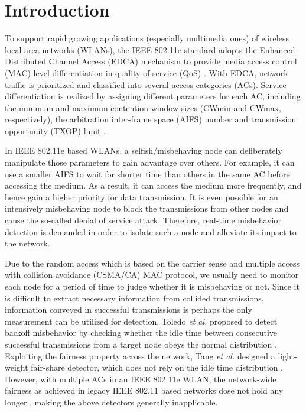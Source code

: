 \documentclass[conference]{IEEEtran}
\begin{document}
\section{Introduction}\label{sec:introduction}
To support rapid growing applications (especially multimedia ones) of wireless local area networks (WLANs), the IEEE 802.11e standard adopts the Enhanced Distributed Channel Access (EDCA) mechanism to provide media access control (MAC) level differentiation in quality of service (QoS) \cite{zhao2013scalable,chendeb2014towards}. With EDCA, network traffic is prioritized and classified into several access categories (ACs). Service differentiation is realized by assigning different parameters for each AC, including the minimum and maximum contention window sizes (CWmin and CWmax, respectively), the arbitration inter-frame space (AIFS) number and transmission opportunity (TXOP) limit \cite{standards2005wireless}.

In IEEE 802.11e based WLANs, a selfish/misbehaving node can deliberately manipulate those parameters to gain advantage over others. For example, it can use a smaller AIFS to wait for shorter time than others in the same AC before accessing the medium. As a result, it can access the medium more frequently, and hence gain a higher priority for data transmission. It is even possible for an intensively misbehaving node to block the transmissions from other nodes and cause the so-called denial of service attack. Therefore, real-time misbehavior detection is demanded in order to isolate such a node and alleviate its impact to the network.

Due to the random access which is based on the carrier sense and multiple access with collision avoidance (CSMA/CA) MAC protocol, we usually need to monitor each node for a period of time to judge whether it is misbehaving or not. Since it is difficult to extract necessary information from collided transmissions, information conveyed in successful transmissions is perhaps the only measurement can be utilized for detection. Toledo \emph{et al.} proposed to detect backoff misbehavior by checking whether the idle time between consecutive successful transmissions from a target node obeys the normal distribution \cite{lopez2007robust}. Exploiting the fairness property across the network, Tang \emph{et al.} designed a light-weight fair-share detector, which does not rely on the idle time distribution \cite{tang2014real}. However, with multiple ACs in an IEEE 802.11e WLAN, the network-wide fairness as achieved in legacy IEEE 802.11 based networks dose not hold any longer \cite{bianchi2005understanding}, making the above detectors generally inapplicable.
\end{document}
